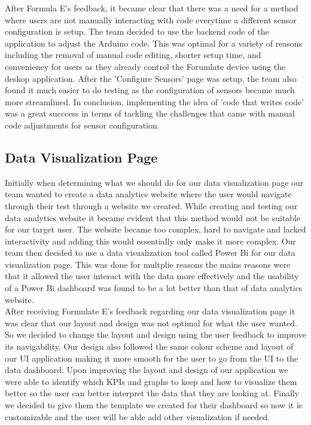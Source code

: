 \documentclass[12pt]{article}
\begin{document}
After Formula E's feedback, it became clear that there was a need for a method where users are not manually interacting with code everytime a different sensor 
configuration is setup. The team decided to use the backend code of the application to adjust the Arduino code. This was optimal for a variety of reasons including
the removal of manual code editing, shorter setup time, and conveniency for users as they already control the Forumlate device using the deskop application. After the
'Configure Sensors' page was setup, the team also found it much easier to do testing as the configuration of sensors became much more streamlined. In conclusion,
implementing the idea of 'code that writes code' was a great succcess in terms of tackling the challenges that came with manual code adjustments for sensor configuration.

\subsection{Data Visualization Page}

Initially when determining what we should do for our data visualization page our team wanted to create a data analytics website where the user would navigate through their test through a website we created. While creating and testing our data analytics website it became evident that this method would not be suitable for our target user. The website became too complex, hard to navigate and lacked interactivity and adding this would essentially only make it more complex. Our team then decided to use a data visualization tool called Power Bi for our data visualization page. This was done for multplie reasons the mains reasons were that it allowed the user interact with the data more effectively and the usability of a Power Bi dashboard was found to be a lot better than that of data analytics website.\\

After receiving Formulate E's feedback regarding our data visualization page it was clear that our layout and design was not optimal for what the user wanted. So we decided to change the layout and design using the user feedback to improve its navigability. Our design also followed the same colour scheme and layout of our UI application making it more smooth for the user to go from the UI to the data dashboard. Upon improving the layout and design of our application we were able to identify which KPIs and graphs to keep and how to visualize them better so the user can better interpret the data that they are looking at. Finally we decided to give them the template we created for their dashboard so now it is customizable and the user will be able add other visualization if needed.\\
\end{document}
